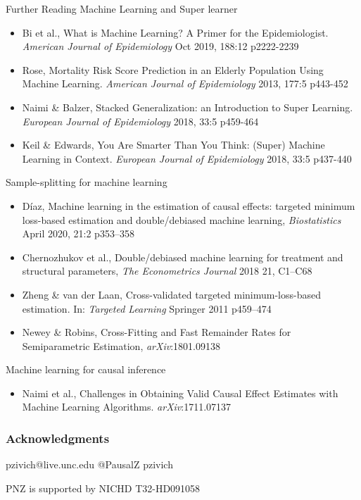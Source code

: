 \documentclass{beamer}
\begin{document}
\begin{frame}{Further Reading}
	\scriptsize
	Machine Learning and Super learner 
	\begin{itemize}
		\item Bi et al., What is Machine Learning? A Primer for the Epidemiologist. \textit{American Journal of Epidemiology} Oct 2019, 188:12 p2222-2239
		\item Rose, Mortality Risk Score Prediction in an Elderly Population Using Machine Learning. \textit{American Journal of Epidemiology} 2013, 177:5 p443-452
		\item Naimi \& Balzer, Stacked Generalization: an Introduction to Super Learning. \textit{European Journal of Epidemiology} 2018, 33:5 p459-464
		\item Keil \& Edwards, You Are Smarter Than You Think: (Super) Machine Learning in Context. \textit{European Journal of Epidemiology} 2018, 33:5 p437-440		
	\end{itemize}
	Sample-splitting for machine learning
	\begin{itemize}
		\item Díaz, Machine learning in the estimation of causal effects: targeted minimum loss-based estimation and double/debiased machine learning, \textit{Biostatistics} April 2020, 21:2 p353–358
		\item Chernozhukov et al., Double/debiased machine learning for treatment and structural parameters, \textit{The Econometrics Journal} 2018 21, C1–C68
		\item Zheng \& van der Laan, Cross-validated targeted minimum-loss-based estimation. In: \textit{Targeted Learning} Springer 2011 p459–474
		\item Newey \& Robins, Cross-Fitting and Fast Remainder Rates for Semiparametric Estimation, \textit{arXiv}:1801.09138
	\end{itemize}
	Machine learning for causal inference
	\begin{itemize}
		\item Naimi et al., Challenges in Obtaining Valid Causal Effect Estimates with Machine Learning Algorithms. \textit{arXiv}:1711.07137
	\end{itemize}	
\end{frame}

\begin{frame}
	\frametitle{Acknowledgments}
	\faEnvelope \quad pzivich@live.unc.edu \qquad
	\faTwitter \quad @PausalZ \qquad
	\faGithub \quad pzivich\\
	\begin{center}
		{\footnotesize PNZ is supported by NICHD T32-HD091058}\\
	\end{center}
\end{frame}
\end{document}
